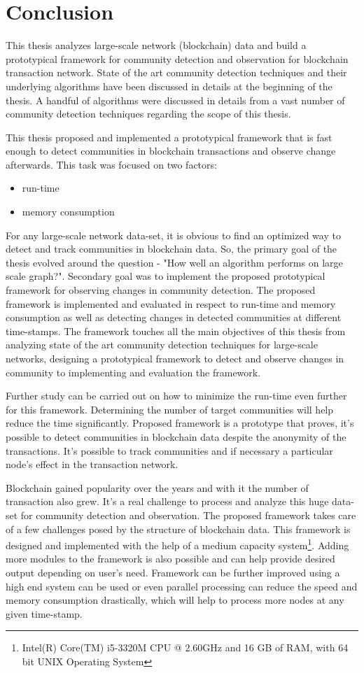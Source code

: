 \chapter{Conclusion}\label{cha:conclusion}

This thesis analyzes large-scale network (blockchain) data and build a prototypical framework for community detection and observation for blockchain transaction network. State of the art community detection techniques and their underlying algorithms have been discussed in details at the beginning of the thesis. A handful of algorithms were discussed in details from a vast number of community detection techniques regarding the scope of this thesis.

This thesis proposed and implemented a prototypical framework that is fast enough to detect communities in blockchain transactions and observe change afterwards. This task was focused on two factors: 
\begin{itemize}
	\item run-time
	\item memory consumption
\end{itemize}
\noindent For any large-scale network data-set, it is obvious to find an optimized way to detect and track communities in blockchain data. So, the primary goal of the thesis evolved around the question - "How well an algorithm performs on large scale graph?". Secondary goal was to implement the proposed prototypical framework for observing changes in community detection. The proposed framework is implemented and evaluated in respect to run-time and memory consumption as well as detecting changes in detected communities at different time-stamps. The framework touches all the main objectives of this thesis from analyzing state of the art community detection techniques for large-scale networks, designing a prototypical framework to detect and observe changes in community to implementing and evaluation the framework.

Further study can be carried out on how to minimize the run-time even further for this framework. Determining the number of target communities will help reduce the time significantly. Proposed framework is a prototype that proves, it's possible to detect communities in blockchain data despite the anonymity of the transactions. It's possible to track communities and if necessary a particular node's effect in the transaction network.

Blockchain gained popularity over the years and with it the number of transaction also grew. It's a real challenge to process and analyze this huge data-set for community detection and observation. The proposed framework takes care of a few challenges posed by the structure of blockchain data. This framework is designed and implemented with the help of a medium capacity system\footnote{Intel(R) Core(TM) i5-3320M CPU @ 2.60GHz and 16 GB of RAM, with 64 bit UNIX Operating System}. Adding more modules to the framework is also possible and can help provide desired output depending on user's need. Framework can be further improved using a high end system can be used or even parallel processing can reduce the speed and memory consumption drastically, which will help to process more nodes at any given time-stamp.

